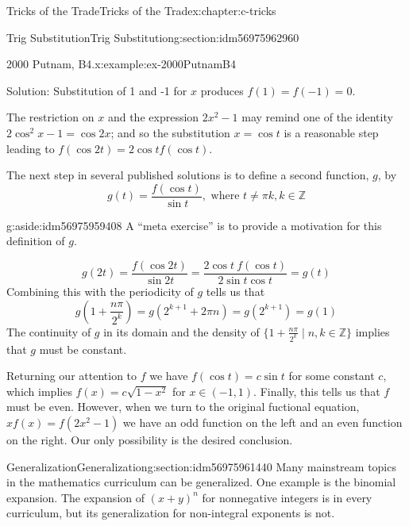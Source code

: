 \documentclass[twoside,10pt,]{book}
\numberwithin{equation}{section}
\begin{document}
\begin{chapterptx}{Tricks of the Trade}{}{Tricks of the Trade}{}{}{x:chapter:c-tricks}
\begin{sectionptx}{Trig Substitution}{}{Trig Substitution}{}{}{g:section:idm56975962960}
\begin{example}{2000 Putnam, B4.}{x:example:ex-2000PutnamB4}
\par
Solution: Substitution of 1 and -1 for \(x\) produces \(f(1)=f(-1)=0\).%
\par
The restriction on \(x\) and the expression \(2 x^2 -1\) may remind one of the identity \(2\cos^2{x} - 1 = \cos{2 x}\); and so the substitution \(x = \cos{t}\) is a reasonable step leading to \(f(\cos{2t})=2 \cos{t} f(\cos{t})\).%
\par
The next step in several published solutions is to define a second function, \(g\), by%
\begin{equation*}
g(t)=\frac{f(\cos{t})}{\sin{t}}, \textrm{ where } t\neq \pi k, k\in \mathbb{Z}
\end{equation*}
%
\begin{aside}{}{g:aside:idm56975959408}%
A ``meta exercise'' is to provide a motivation for this definition of \(g\).%
\end{aside}
%
\begin{equation*}
g(2t)=\frac{f(\cos{2t})}{\sin{2t}}=\frac{2 \cos{t}\: f(\cos{t})}{2\sin{t}\cos{t}}=g(t)
\end{equation*}
Combining this with the periodicity of \(g\) tells us that%
\begin{equation*}
g(1+\frac{n \pi}{2^k})=g(2^{k+1}+2 \pi n) = g(2^{k+1})=g(1)
\end{equation*}
The continuity of \(g\) in its domain and the density of \(\{1+\frac{n \pi}{2^k} \mid n,k \in \mathbb{Z}\}\) implies that \(g\) must be constant.%
\par
Returning our attention to \(f\) we have \(f(\cos{t})= c \sin{t}\) for some constant \(c\), which implies \(f(x) = c \sqrt{1-x^2}\) for \(x \in (-1,1)\).  Finally, this tells us that \(f\) must be even.  However, when we turn to the original fuctional equation, \(x f(x)=f(2x^2-1)\) we have an odd function on the left and an even function on the right.  Our only possibility is the desired conclusion.%
\end{example}
\end{sectionptx}
%
%
\typeout{************************************************}
\typeout{************************************************}
%
\begin{sectionptx}{Generalization}{}{Generalization}{}{}{g:section:idm56975961440}
Many mainstream topics in the mathematics curriculum can be generalized. One example is the binomial expansion.  The expansion of \((x+y)^n\) for nonnegative integers is in every curriculum, but its generalization for non-integral exponents is not.%

\end{sectionptx}
\end{chapterptx}
\end{document}
